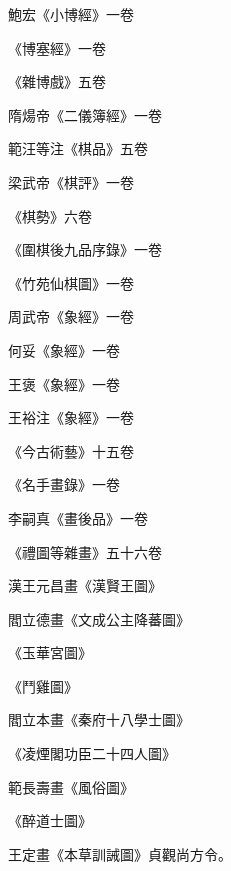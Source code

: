 \begin{pinyinscope}
 鮑宏《小博經》一卷



 《博塞經》一卷



 《雜博戲》五卷



 隋煬帝《二儀簿經》一卷



 範汪等注《棋品》五卷



 梁武帝《棋評》一卷



 《棋勢》六卷



 《圍棋後九品序錄》一卷



 《竹苑仙棋圖》一卷



 周武帝《象經》一卷



 何妥《象經》一卷



 王褒《象經》一卷



 王裕注《象經》一卷



 《今古術藝》十五卷



 《名手畫錄》一卷



 李嗣真《畫後品》一卷



 《禮圖等雜畫》五十六卷



 漢王元昌畫《漢賢王圖》



 閻立德畫《文成公主降蕃圖》



 《玉華宮圖》



 《鬥雞圖》



 閻立本畫《秦府十八學士圖》



 《凌煙閣功臣二十四人圖》



 範長壽畫《風俗圖》



 《醉道士圖》



 王定畫《本草訓誡圖》貞觀尚方令。




\end{pinyinscope}
